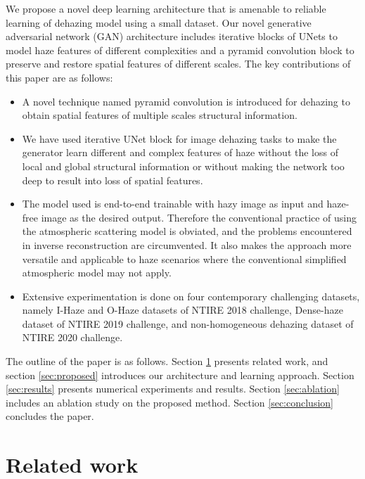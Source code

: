 \documentclass[runningheads]{llncs}
\begin{document}
We propose a novel deep learning architecture that is amenable to reliable learning of dehazing model using a small dataset. Our novel generative adversarial network (GAN) architecture includes iterative blocks of UNets to model haze features of different complexities and a pyramid convolution block to preserve and restore spatial features of different scales. The key contributions of this paper are as follows: 
\begin{itemize}
    \item A novel technique named pyramid convolution is introduced for dehazing to obtain spatial features of multiple scales structural information.
    \item We have used iterative UNet block for image dehazing tasks to make the generator learn different and complex features of haze without the loss of local and global structural information or without making the network too deep to result into loss of spatial features.
    \item The model used is end-to-end trainable with hazy image as input and haze-free image as the desired output. Therefore the conventional practice of using the atmospheric scattering model is obviated, and the problems encountered in inverse reconstruction are circumvented. It also makes the approach more versatile and applicable to haze scenarios where the conventional simplified atmospheric model may not apply.   
    \item Extensive experimentation is done on four contemporary challenging datasets, namely I-Haze and O-Haze datasets of NTIRE 2018 challenge, Dense-haze dataset of NTIRE 2019 challenge, and non-homogeneous dehazing dataset of NTIRE 2020 challenge. 
\end{itemize}

The outline of the paper is as follows. Section \ref{sec:related} presents related work, and section \ref{sec:proposed} introduces our architecture and learning approach. Section \ref{sec:results} presents numerical experiments and results. Section \ref{sec:ablation} includes an ablation study on the proposed method. Section \ref{sec:conclusion} concludes the paper.

\section{Related work} \label{sec:related}
\end{document}
